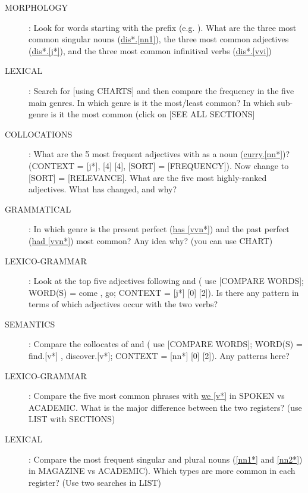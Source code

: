 \documentclass[a4paper,landscape,headrule,footrule,xetex]{foils}
\begin{document}
\begin{description}
\item [MORPHOLOGY]: Look for words starting with the prefix 
  (e.g. ).  What are the three most common singular nouns
  (\url{dis*.[nn1]}), the three most common adjectives (\url{dis*.[j*]}), and the
  three most common infinitival verbs (\url{dis*.[vvi]})

\item [LEXICAL]: Search for  [using CHARTS] and then
  compare the frequency in the five main genres.  In which genre is it
  the most/least common? In which sub-genre is it the most common
  (click on [SEE ALL SECTIONS]
\newpage

 \item [COLLOCATIONS]: What are the 5 most frequent adjectives with
    as a noun (\url{curry.[nn*]})? (CONTEXT = [j*], [4] [4], [SORT] =
   [FREQUENCY]). Now change to [SORT] = [RELEVANCE]. What are the five
   most highly-ranked adjectives. What has changed, and why?

\item[GRAMMATICAL]: In which genre is the present perfect (\url{has
    [vvn*]}) and the past perfect (\url{had [vvn*]}) most common? Any
  idea why? (you can use CHART)

\item[LEXICO-GRAMMAR]: Look at the top five adjectives following
   and  ( use [COMPARE WORDS]; WORD(S) = come , go;
  CONTEXT =  [j*] [0] [2]). Is there any pattern in terms of which
  adjectives occur with the two verbs?

\newpage
\item[SEMANTICS]: Compare the collocates of  and
   ( use [COMPARE WORDS]; WORD(S) = find.[v*] ,
  discover.[v*]; CONTEXT = [nn*] [0] [2]). Any patterns here?

\item[LEXICO-GRAMMAR]: Compare the five most common phrases with
  \url{we [v*]} in SPOKEN vs ACADEMIC.  What is the major difference
  between the two registers? (use LIST with SECTIONS)

\item[LEXICAL]: Compare the most frequent singular and plural nouns
  (\url{[nn1*]} and \url{[nn2*]}) in MAGAZINE vs ACADEMIC).  Which
  types are more common in each register? (Use two searches in LIST)
\end{description}
\end{document}
